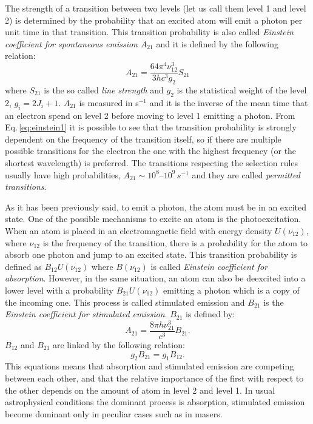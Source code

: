 \documentclass[../main.tex]{subfiles}
\begin{document}
The strength of a transition between two levels (let us call them level 1 and level 2) is determined by the probability that an excited atom will emit a photon per unit time in that transition.
This transition probability is also called \emph{Einstein coefficient for spontaneous emission} $A_{21}$ and it is defined by the following relation:
\begin{equation}
    \label{eq:einstein1}
    A_{21} = \frac{64\pi^{4}\nu_{12}^3}{3hc^3g_2}S_{21}
\end{equation}
where $S_{21}$ is the so called \emph{line strength} and $g_2$ is the statistical weight of the level 2, $g_i = 2J_i+1$.
$A_{21}$ is measured in s$^{-1}$ and it is the inverse of the mean time that an electron spend on level 2 before moving to level 1 emitting a photon.
From Eq.\,\ref{eq:einstein1} it is possible to see that the transition probability is strongly dependent on the frequency of the transition itself, so if there are multiple possible transitions for the electron the one with the highest frequency (or the shortest wavelength) is preferred.
The transitions respecting the selection rules usually have high probabilities, $A_{21}\sim 10^8$--$10^9\,\si{s^{-1}}$ and they are called \emph{permitted transitions}.

As it has been previously said, to emit a photon, the atom must be in an excited state.
One of the possible mechanisms to excite an atom is the photoexcitation.
When an atom is placed in an electromagnetic field with energy density $U(\nu_{12})$, where $\nu_{12}$ is the frequency of the transition, there is a probability for the atom to absorb one photon and jump to an excited state.
This transition probability is defined as $B_{12}U(\nu_{12})$ where $B(\nu_{12})$ is called \emph{Einstein coefficient for absorption}.
However, in the same situation, an atom can also be deexcited into a lower level with a probability $B_{21}U(\nu_{12})$ emitting a photon which is a copy of the incoming one.
This process is called stimulated emission and $B_{21}$ is the \emph{Einstein coefficient for stimulated emission}.
$B_{21}$ is defined by:
\begin{equation}
    \label{eq:einstein2}
    A_{21} = \frac{8\pi h\nu_{21}^3}{c^3} B_{21}.
\end{equation}
$B_{12}$ and $B_{21}$ are linked by the following relation:
\begin{equation}
    \label{eq:einstein3}
    g_2B_{21} = g_1B_{12}.
\end{equation}
This equations means that absorption and stimulated emission are competing between each other, and that the relative importance of the first with respect to the other depends on the amount of atom in level 2 and level 1.
In usual astrophysical conditions the dominant process is absorption, stimulated emission become dominant only in peculiar cases such as in masers. 
\end{document}
